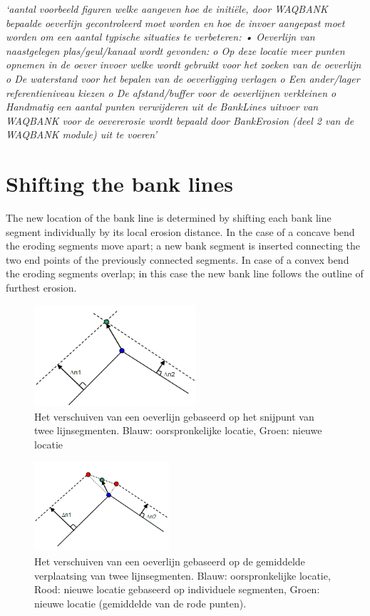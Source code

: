 \emph{`aantal voorbeeld figuren welke aangeven hoe de initi\"ele, door WAQBANK bepaalde oeverlijn gecontroleerd moet worden en hoe de invoer aangepast moet worden om een aantal typische situaties te verbeteren:
•	Oeverlijn van naastgelegen plas/geul/kanaal wordt gevonden: 
o	Op deze locatie meer punten opnemen in de oever invoer welke wordt gebruikt voor het zoeken van de oeverlijn
o	De waterstand voor het bepalen van de oeverligging verlagen
o	Een ander/lager referentieniveau kiezen
o	De afstand/buffer voor de oeverlijnen verkleinen
o	Handmatig een aantal punten verwijderen uit de BankLines uitvoer van WAQBANK voor de oevererosie wordt bepaald door BankErosion (deel 2 van de WAQBANK module) uit te voeren'}

\section{Shifting the bank lines} \label{Sec:BankShift}

The new location of the bank line is determined by shifting each bank line segment individually by its local erosion distance.
In the case of a concave bend the eroding segments move apart; a new bank segment is inserted connecting the two end points of the previously connected segments.
In case of a convex bend the eroding segments overlap; in this case the new bank line follows the outline of furthest erosion.

\begin{figure}[!h]
\includegraphics[width=6cm]{figures/Fig4-3.png}
\caption{Het verschuiven van een oeverlijn gebaseerd op het snijpunt van twee lijnsegmenten.
Blauw: oorspronkelijke locatie, Groen: nieuwe locatie}
\label{Fig4.3}
\end{figure}

\begin{figure}[!h]
\includegraphics[width=5cm]{figures/Fig4-4.png}
\caption{Het verschuiven van een oeverlijn gebaseerd op de gemiddelde verplaatsing van twee lijnsegmenten.
Blauw: oorspronkelijke locatie, Rood: nieuwe locatie gebaseerd op individuele segmenten, Groen: nieuwe locatie (gemiddelde van de rode punten).}
\label{Fig4.4}
\end{figure}